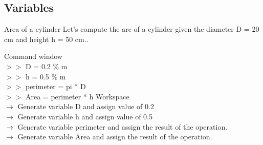 \documentclass[xcolor={dvipsnames,rgb}, aspectratio=169]{beamer}
\begin{document}
\subsection{Variables}
\begin{frame}{Area of a cylinder}
\large \color{mylilas} Let's compute the are of a cylinder given the diameter D = 20 cm
and height h = 50 cm.\color{black}.

\begin{tcolorbox}[colback=white,colframe=bluepoli,sidebyside]
   \color{mygreen} Command window \color{black}\\
      $>>$ D = 0.2 \color{codegreen} \% m \color{black} \\
      $>>$ h = 0.5 \color{codegreen} \% m \color{black}\\
      $>>$ perimeter = pi * D\\
      $>>$ Area = perimeter * h
   \tcblower
   \color{mygreen} Workspace \color{black} \\
      \small $\rightarrow$ Generate variable D and assign value of 0.2\\
      $\rightarrow$ Generate variable h and assign value of 0.5\\
      $\rightarrow$ Generate variable perimeter and assign the result of the operation.\\
      $\rightarrow$ Generate variable Area and assign the result of the operation.\\
\end{tcolorbox}
\end{frame}
\end{document}
